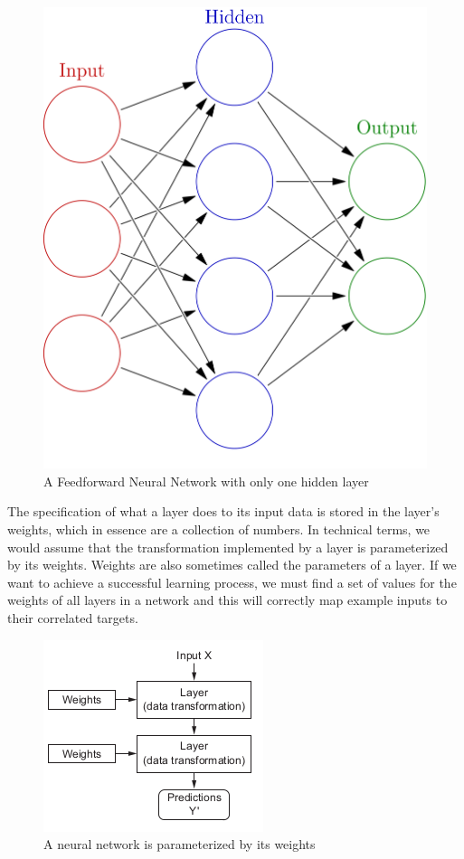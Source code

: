 \begin{figure}[H]
    \centering
    \includegraphics[scale=.20]{./images/background/simplefnn.png}
    \caption{A Feedforward Neural Network with only one hidden layer}
    \label{fig:ffnn_fig}
\end{figure}

The specification of what a layer does to its input data is stored in the layer’s weights,
which in essence are a collection of numbers.
In technical terms, we would assume that the transformation implemented by a layer is parameterized by its weights.
Weights are also sometimes called the parameters of a layer.
If we want to achieve a successful learning process, we must find a set of values for the weights of all
layers in a network and this will correctly
map example inputs to their correlated targets.

\begin{figure}[H]
    \centering
    \includegraphics[scale=1.]{./images/background/params.png}
    \caption{A neural network is parameterized by its weights}
    \label{fig:params}
\end{figure}

